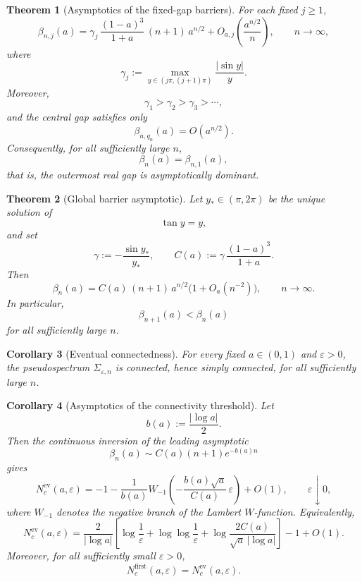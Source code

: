 \documentclass[11pt]{article}
\numberwithin{equation}{section}
\newtheorem{theorem}{Theorem}[section]
\newtheorem{corollary}[theorem]{Corollary}
\begin{document}
\begin{theorem}[Asymptotics of the fixed-gap barriers]
\label{thm:fixed-gap-barriers}
For each fixed \(j\ge1\),
\[
\beta_{n,j}(a)
=
\gamma_j\,\frac{(1-a)^3}{1+a}\,(n+1)\,a^{n/2}
+
O_{a,j}\!\left(\frac{a^{n/2}}{n}\right),
\qquad n\to\infty,
\]
where
\[
\gamma_j:=\max_{y\in(j\pi,(j+1)\pi)}\frac{|\sin y|}{y}.
\]
Moreover,
\[
\gamma_1>\gamma_2>\gamma_3>\cdots,
\]
and the central gap satisfies only
\[
\beta_{n,q_n}(a)=O(a^{n/2}).
\]
Consequently, for all sufficiently large \(n\),
\[
\beta_n(a)=\beta_{n,1}(a),
\]
that is, the outermost real gap is asymptotically dominant.
\end{theorem}

\begin{theorem}[Global barrier asymptotic]
\label{thm:global-beta-asymp}
Let \(y_*\in(\pi,2\pi)\) be the unique solution of
\[
\tan y=y,
\]
and set
\[
\gamma:=-\frac{\sin y_*}{y_*},
\qquad
C(a):=\gamma\,\frac{(1-a)^3}{1+a}.
\]
Then
\[
\beta_n(a)
=
C(a)\,(n+1)\,a^{n/2}\bigl(1+O_a(n^{-2})\bigr),
\qquad n\to\infty.
\]
In particular,
\[
\beta_{n+1}(a)<\beta_n(a)
\]
for all sufficiently large \(n\).
\end{theorem}

\begin{corollary}[Eventual connectedness]
\label{cor:eventual-connect}
For every fixed \(a\in(0,1)\) and \(\varepsilon>0\), the pseudospectrum
\(\Sigma_{\varepsilon,n}\) is connected, hence simply connected, for all sufficiently
large \(n\).
\end{corollary}

\begin{corollary}[Asymptotics of the connectivity threshold]
\label{cor:threshold-asymp}
Let
\[
b(a):=\frac{|\log a|}{2}.
\]
Then the continuous inversion of the leading asymptotic
\[
\beta_n(a)\sim C(a)(n+1)e^{-b(a)n}
\]
gives
\[
N_c^{\mathrm{ev}}(a,\varepsilon)
=
-1-\frac{1}{b(a)}
W_{-1}\!\left(
-\frac{b(a)\sqrt a}{C(a)}\,\varepsilon
\right)
+O(1),
\qquad \varepsilon\downarrow0,
\]
where \(W_{-1}\) denotes the negative branch of the Lambert \(W\)-function.
Equivalently,
\[
N_c^{\mathrm{ev}}(a,\varepsilon)
=
\frac{2}{|\log a|}
\left[
\log\frac1\varepsilon
+
\log\log\frac1\varepsilon
+
\log\frac{2C(a)}{\sqrt a\,|\log a|}
\right]
-1+O(1).
\]
Moreover, for all sufficiently small \(\varepsilon>0\),
\[
N_c^{\mathrm{first}}(a,\varepsilon)=N_c^{\mathrm{ev}}(a,\varepsilon).
\]
\end{corollary}
\end{document}
